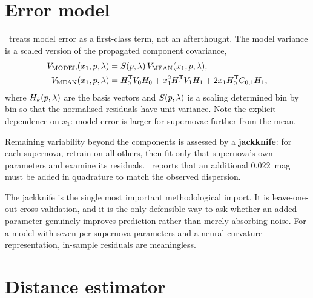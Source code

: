 \documentclass[11pt]{article}
\begin{document}
\section{Error model}

\salt\ treats model error as a first-class term, not an afterthought. The model
variance is a scaled version of the propagated component covariance,
\begin{align}
  V_{\mathrm{MODEL}}(x_{1},p,\lambda)
    &= S(p,\lambda)\, V_{\mathrm{MEAN}}(x_{1},p,\lambda), \\
  V_{\mathrm{MEAN}}(x_{1},p,\lambda)
    &= H_{0}^{\mathsf{T}}V_{0}H_{0}
     + x_{1}^{2}H_{1}^{\mathsf{T}}V_{1}H_{1}
     + 2x_{1}H_{0}^{\mathsf{T}}C_{0,1}H_{1},
\end{align}
where $H_{k}(p,\lambda)$ are the basis vectors and $S(p,\lambda)$ is
a scaling determined bin by bin so that the normalised residuals have unit
variance. Note the explicit dependence on $x_{1}$: model error is larger for
supernovae further from the mean.

Remaining variability beyond the components is assessed by a \textbf{jackknife}:
for each supernova, retrain on all others, then fit only that supernova's own
parameters and examine its residuals. \salt\ reports that an additional
0.022~mag must be added in quadrature to match the observed dispersion.

The jackknife is the single most important methodological import. It is
leave-one-out cross-validation, and it is the only defensible way to ask
whether an added parameter genuinely improves prediction rather than merely
absorbing noise. For a model with seven per-supernova parameters and a neural
curvature representation, in-sample residuals are meaningless.

\section{Distance estimator}
\end{document}
